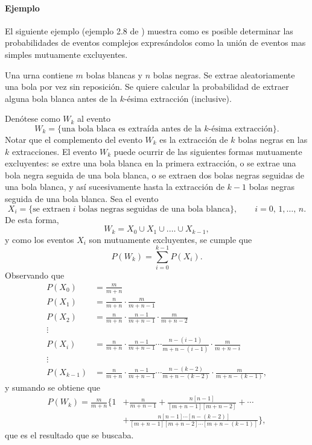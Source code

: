 \documentclass[a4paper]{report}
\begin{document}
\paragraph{Ejemplo} El siguiente ejemplo (ejemplo 2.8 de \cite{papoulis2002probability}) muestra como es posible determinar las probabilidades de eventos complejos expresándolos como la unión de eventos mas simples mutuamente excluyentes.

Una urna contiene \(m\) bolas blancas y \(n\) bolas negras. Se extrae aleatoriamente una bola por vez sin reposición. Se quiere calcular la probabilidad de extraer alguna bola blanca antes de la \(k\)-ésima extracción (inclusive).

Denótese como \(W_k\) al evento
\[
 W_k=\{\textrm{una bola blaca es extraída antes de la }k\textrm{-ésima extracción}\}.
\]
Notar que el complemento del evento \(W_k\) es la extracción de \(k\) bolas negras en las \(k\) extracciones. El evento \(W_k\) puede ocurrir de las siguientes formas mutuamente excluyentes: se extre una bola blanca en la primera extracción, o se extrae una bola negra seguida de una bola blanca, o se extraen dos bolas negras seguidas de una bola blanca, y así sucesivamente hasta la extracción de \(k-1\) bolas negras seguida de una bola blanca.  Sea el evento
\[
 X_i=\{\textrm{se extraen }i\textrm{ bolas negras seguidas de una bola blanca}\},\qquad i=0,\,1,\dots,\,n.
\]
De esta forma,
\[
 W_k = X_0\cup X_1\cup.\dots\cup X_{k-1},
\]
y como los eventos \(X_i\) son mutuamente excluyentes, se cumple que
\[
 P(W_k)=\sum_{i=0}^{k-1}P(X_i).
\]
Observando que
\begin{align*}
 P(X_0)&=\frac{m}{m+n}\\
 P(X_1)&=\frac{n}{m+n}\cdot\frac{m}{m+n-1}\\
 P(X_2)&=\frac{n}{m+n}\cdot\frac{n-1}{m+n-1}\cdot\frac{m}{m+n-2}\\
 \vdots \quad& \\
 P(X_i)&=\frac{n}{m+n}\cdot\frac{n-1}{m+n-1}\cdots\frac{n-(i-1)}{m+n-(i-1)}\cdot\frac{m}{m+n-i}\\
 \vdots \quad& \\
 P(X_{k-1})&=\frac{n}{m+n}\cdot\frac{n-1}{m+n-1}\cdots\frac{n-(k-2)}{m+n-(k-2)}\cdot\frac{m}{m+n-(k-1)},
\end{align*}
y sumando se obtiene que
\begin{equation}\label{eq:example_2-8_result}
 \begin{aligned}
 P(W_k) = \frac{m}{m+n}\bigg\{1&+\frac{n}{m+n-1}+\frac{n[n-1]}{[m+n-1][m+n-2]}+\cdots\\
  &+\frac{n[n-1]\cdots[n-(k-2)]}{[m+n-1][m+n-2]\cdots[m+n-(k-1)]}\bigg\},
\end{aligned}
\end{equation}
que es el resultado que se buscaba. 
\end{document}
